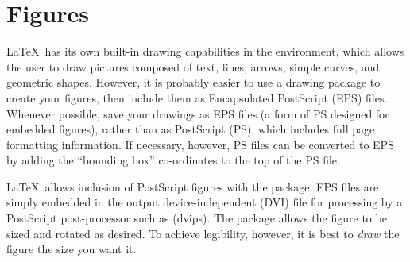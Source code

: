 \section{Figures}
\LaTeX\ has its own built-in drawing capabilities in the  environment, which allows the user to draw pictures composed of text, lines, arrows, simple curves, and geometric shapes.
However, it is probably easier to use a drawing package to create your figures, then include them as Encapsulated PostScript (EPS) files.
Whenever possible, save your drawings as EPS files (a form of PS designed for embedded figures), rather than as PostScript (PS), which includes full page formatting information.
If necessary, however, PS files can be converted to EPS by adding the ``bounding box'' co-ordinates to the top of the PS file.

\LaTeX\ allows inclusion of PostScript figures with the  package.
EPS files are simply embedded in the output device-independent (DVI) file for processing by a PostScript post-processor such as \program(dvips).
The  package allows the figure to be sized and rotated as desired.
To achieve legibility, however, it is best to \emph{draw} the figure the size you want it.

